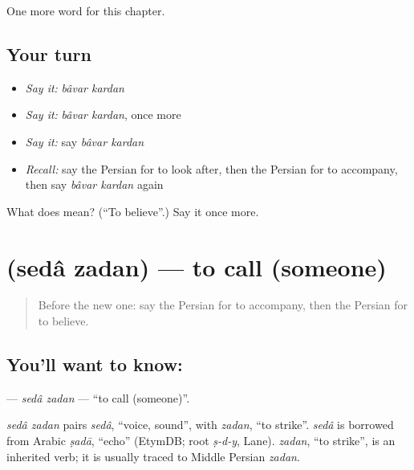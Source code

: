 \begin{grammarlens}[title={What you've built}]
One more word for this chapter.
\end{grammarlens}

\subsection*{Your turn}
\begin{itemize}
\raggedright
  \item \emph{Say it:} \emph{bâvar kardan}
  \item \emph{Say it:} \emph{bâvar kardan}, once more
  \item \emph{Say it:} say \emph{bâvar kardan}
  \item \emph{Recall:} say the Persian for to look after, then the Persian for to accompany, then say \emph{bâvar kardan} again
\end{itemize}

\begin{tcolorbox}[breakable,colback=teal!4,colframe=teal!35!black,title={Before you move on}]
What does   mean? (\textquotedblleft{}To believe\textquotedblright{}.) Say it once more.
\end{tcolorbox}
\section[\texorpdfstring{\fa{صدا} \fa{زدن} (sedâ zadan)}{صدا زدن (sedâ zadan)}]{  (sedâ zadan) — to call (someone)}

\label{lesson:FA-C145-seda-zadan}



\begin{quote}
Before the new one: say the Persian for to accompany, then the Persian for to believe.
\end{quote}

\subsection*{You'll want to know:  }
\textbf{ } — \emph{sedâ zadan} — \textquotedblleft{}to call (someone)\textquotedblright{}.

\begin{cousinweb}
\emph{sedâ zadan} pairs \emph{sedâ}, \textquotedblleft{}voice, sound\textquotedblright{}, with \emph{zadan}, \textquotedblleft{}to strike\textquotedblright{}. \emph{sedâ} is borrowed from Arabic \emph{ṣadā}, \textquotedblleft{}echo\textquotedblright{} (EtymDB; root \emph{ṣ-d-y}, Lane). \emph{zadan}, \textquotedblleft{}to strike\textquotedblright{}, is an inherited verb; it is usually traced to Middle Persian \emph{zadan}.
\end{cousinweb}

